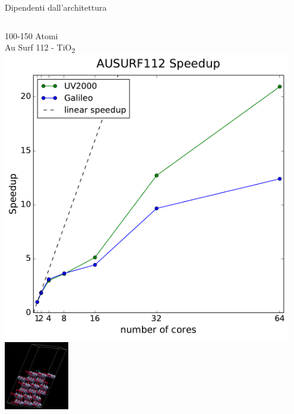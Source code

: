 \documentclass[8pt]{beamer}
\begin{document}
\begin{frame}{Dipendenti dall'architettura}
\begin{columns}
	
	\begin{center}	
		100-150 Atomi\\
		Au Surf 112 - TiO\textsubscript{2}\\
		\includegraphics[width=0.95\textwidth]{concl_ausurf.pdf}\\		
		\includegraphics[height=3cm]{titania_crystal.png}
	\end{center}	
			


\end{columns}
\end{frame}
\end{document}
